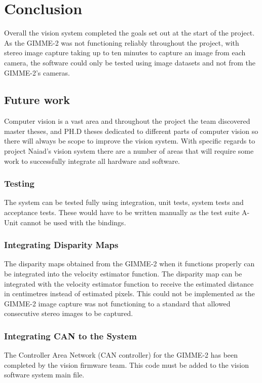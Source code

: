 \section{Conclusion}\label{sec:conclusion}
Overall the vision system completed the goals set out at the start of the project. As the GIMME-2 was not functioning reliably throughout the project, with stereo image capture taking up to ten minutes to capture an image from each camera, the software could only be tested using image datasets and not from the GIMME-2's cameras. 
\subsection{Future work}
Computer vision is a vast area and throughout the project the team discovered master theses, and PH.D theses dedicated to different parts of computer vision so there will always be scope to improve the vision system. With specific regards to project Naiad's vision system there are a number of areas that will require some work to successfully integrate all hardware and software.
\subsubsection{Testing}
The system can be tested fully using integration, unit tests, system tests and acceptance tests. These would have to be written manually as the test suite A-Unit cannot be used with the bindings.

\subsubsection{Integrating Disparity Maps}
The disparity maps obtained from the GIMME-2 when it functions properly can be integrated into the velocity estimator function.
The disparity map can be integrated with the velocity estimator function to receive the estimated distance in centimetres instead of estimated pixels. This could not be implemented as the GIMME-2 image capture was not functioning to a standard that allowed consecutive stereo images to be captured.

\subsubsection{Integrating CAN to the System}
The Controller Area Network (CAN controller) for the GIMME-2 has been completed by the vision firmware team. This code must be added to the vision software system main file.

